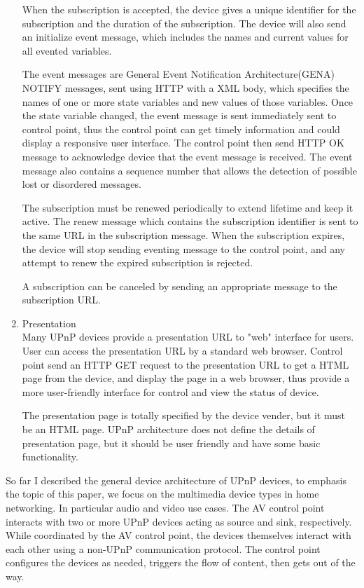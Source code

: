 \begin{enumerate}
When the subscription is accepted, the device gives a unique identifier for the subscription and 
the duration of the subscription. The device will also send an initialize event message, which 
includes the names and current values for all evented variables.

The event messages are General Event Notification Architecture(GENA) NOTIFY
messages, sent using HTTP with a XML body, which specifies the names of one or
more state variables and new values of those variables. Once the state variable
changed, the event message is sent immediately sent to control point, thus the
control point can get timely information and could display a responsive user
interface. The control point then send HTTP OK message to acknowledge device
that the event message is received. The event message also contains a sequence
number that allows the detection of possible lost or disordered messages.

The subscription must be renewed periodically to extend lifetime and keep it active. The renew 
message which contains the subscription identifier is sent to the same URL in the subscription 
message. When the subscription expires, the device will stop sending eventing message to the 
control point, and any attempt to renew the expired subscription is rejected.

A subscription can be canceled by sending an appropriate message to the subscription URL.

\item Presentation \\
Many UPnP devices provide a presentation URL to "web" interface for users. User can access the 
presentation URL by a standard web browser. Control point send an HTTP GET request to the 
presentation URL to get a HTML page from the device, and display the page in a web browser, thus 
provide a more user-friendly interface for control and view the status of device. 

The presentation page is totally specified by the device vender, but it must be an HTML page. 
UPnP architecture does not define the details of presentation page, but it should be user friendly 
and have some basic functionality.

\end{enumerate}

So far I described the general device architecture of UPnP devices, to
emphasis the topic of this paper, we focus on the multimedia device types in
home networking. In particular audio and video use cases\label{upnpav}. The AV
control point interacts with two or more UPnP devices acting as source and
sink, respectively. While coordinated by the AV control point, the devices
themselves interact with each other using a non-UPnP communication protocol.
The control point configures the devices as needed, triggers the flow of
content, then gets out of the way.

